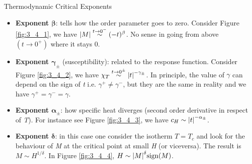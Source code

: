 \documentclass[../../Main/Main.tex]{subfiles}
\begin{document}
\begin{definition}{Thermodynamic Critical Exponents}{}
\begin{itemize}
\item \textbf{Exponent \( \pmb{\beta} \)}: tells how the order parameter goes to zero.
Consider Figure \ref{fig:3_4_1}, we have \( \abs{M} \overset{t \rightarrow  0^-}{\sim} (-t)^{\beta }  \). No sense in going from above \( (t \rightarrow 0^+) \) where it stays 0.

\item \textbf{Exponent \(\pmb{ \gamma _{\pm} } \)} (susceptibility): related to the response function. Consider Figure \ref{fig:3_4_2}, we have \( \chi _T \overset{t \rightarrow 0^{\pm}}{\sim} \abs{t}^{-\gamma _{\pm} }   \). In principle, the value of \( \gamma   \) can depend on the sign of \emph{t} i.e.   \( \gamma ^+ \neq \gamma ^-  \), but they are the same in reality and we have \( \gamma ^+ = \gamma ^- = \gamma     \).

\item \textbf{Exponent \(\pmb{ \alpha _{\pm} }\)}: how specific heat diverges (second order derivative in respect of \emph{T}). For instance see Figure \ref{fig:3_4_3}, we have \( c_H \sim \abs{t}^{-\alpha _{\pm}}  \).

\item \textbf{Exponent \( \pmb{\delta   }\)}: in this case one consider the isotherm \( T =T_c \) and look for the behaviour of \emph{M} at the critical point at small \emph{H} (or viceversa).  The result is \( M \sim H^{1/\delta } \).
In Figure \ref{fig:3_4_4}, \( H \sim \abs{M}^{\delta } \text{sign} (M)  \).

\end{itemize}
\end{definition}
\end{document}
